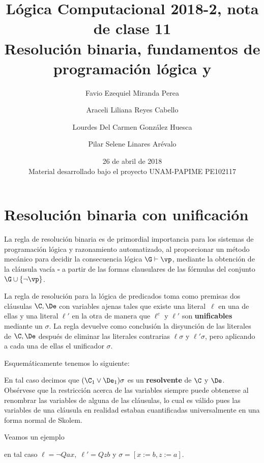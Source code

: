 \documentclass[11pt,letterpaper]{article}
\title{Lógica Computacional 2018-2, nota de clase 11 \\
Resolución binaria, fundamentos de programación lógica y {\pl}
}
\author{Favio Ezequiel Miranda Perea \and Araceli Liliana Reyes Cabello\and
Lourdes Del Carmen Gonz\'alez Huesca \and Pilar Selene Linares Arévalo}
\date{26 de abril de 2018 \\
Material desarrollado bajo el proyecto UNAM-PAPIME PE102117}
\begin{document}
\maketitle


\section{Resolución binaria con unificación}

La regla de resolución binaria es de primordial importancia para los sistemas
de programación lógica y razonamiento automatizado, al proporcionar un método
mecánico para decidir la consecuencia lógica $\G\vdash \vp$, mediante la
obtención de la cláusula vacía $\square$ a partir 
de las formas clausulares de las fórmulas del conjunto $\G\cup\{\lnot\vp\}$.


La regla de resolución para la lógica de predicados toma como
premisas dos cláusulas $\C,\De$ con variables ajenas tales que existe una
literal~$\ell$ en una de ellas y una literal $\ell'$ en la otra de manera que 
$\ell^c$ y $\ell'$ son \textbf{unificables} mediante un $\sigma$. 
La regla devuelve como conclusión la disyunción de las literales de $\C,\De$ 
después de eliminar las literales contrarias $\ell\sigma$ y $\ell'\sigma$, pero 
aplicando a cada una de ellas el unificador $\sigma$.

Esquemáticamente tenemos lo siguiente:
\begin{mathpar}
\end{mathpar}
En tal caso decimos que $(\C_1\lor\De_1)\sigma$ es un \textbf{resolvente} de
$\C$ y $\De$.\\
Obsérvese que la restricción acerca de las variables siempre puede obtenerse
al renombrar las variables de alguna de las cláusulas, lo cual es válido pues
las variables de una cláusula en realidad estaban cuantificadas
universalmente en una forma normal de Skolem.


\noindent Veamos un ejemplo
\begin{mathpar}
\end{mathpar}
en tal caso $\ell=\neg Qax,\;\ell'=Qzb$ y $\sigma=[x:=b,z:=a]$.


\medskip
\end{document}
